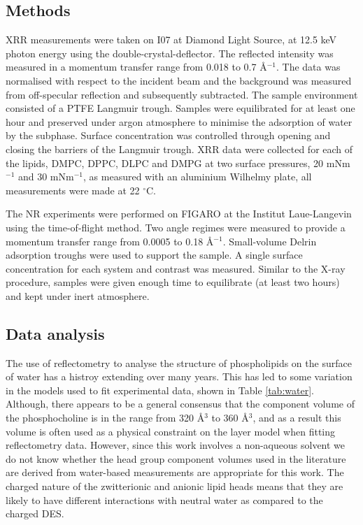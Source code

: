 \documentclass[twoside,twocolumn,9pt]{article}
\begin{document}
\subsection{Methods}
XRR measurements were taken on I07 at Diamond Light Source, at 12.5 keV photon energy using the double-crystal-deflector.\cite{Arnold2012} The reflected intensity was measured in a momentum transfer range from 0.018 to 0.7 \AA$^{-1}$. The data was normalised with respect to the incident beam and the background was measured from off-specular reflection and subsequently subtracted. The sample environment consisted of a PTFE Langmuir trough. Samples were equilibrated for at least one hour and preserved under argon atmosphere to minimise the adsorption of water by the subphase. Surface concentration was controlled through opening and closing the barriers of the Langmuir trough. XRR data were collected for each of the lipids, DMPC, DPPC, DLPC and DMPG at two surface pressures, 20 mNm$^{-1}$ and 30 mNm$^{-1}$, as measured with an aluminium Wilhelmy plate, all measurements were made at 22 $^\circ$C. 

The NR experiments were performed on FIGARO at the Institut Laue-Langevin using the time-of-flight method.\cite{Campbell2011} Two angle regimes were measured to provide a momentum transfer range from 0.0005 to 0.18 \AA$^{-1}$. Small-volume Delrin adsorption troughs were used to support the sample. A single surface concentration for each system and contrast was measured. Similar to the X-ray procedure, samples were given enough time to equilibrate (at least two hours) and kept under inert atmosphere.


\subsection{Data analysis}
The use of reflectometry to analyse the structure of phospholipids on the surface of water has a histroy extending over many years.\cite{Mohwald1990,Kewalramani2010,Bayerl1990,Johnson1991,Clifton2012,Helm1987,Daillant1990} This has led to some variation in the models used to fit experimental data, shown in Table \ref{tab:water}. Although, there appears to be a general consensus that the component volume of the phosphocholine is in the range from 320 \AA$^3$ to 360 \AA$^3$, and as a result this volume is often used as a physical constraint on the layer model when fitting reflectometry data. However, since this work involves a non-aqueous solvent we do not know whether the head group component volumes used in the literature are derived from water-based measurements are appropriate for this work. The charged nature of the zwitterionic and anionic lipid heads means that they are likely to have different interactions with neutral water as compared to the charged DES.\cite{Sanchez-Fernandez2018} 
\end{document}
